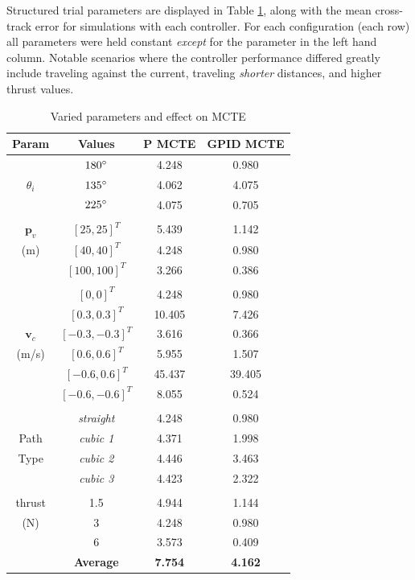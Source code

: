 \documentclass[conference]{IEEEtran}
\begin{document}
Structured trial parameters are displayed in Table \ref{table:str_trials}, along with the mean cross-track error for simulations with each controller. For each configuration (each row) all parameters were held constant \textit{except} for the parameter in the left hand column. Notable scenarios where the controller performance differed greatly include traveling against the current, traveling \textit{shorter} distances, and higher thrust values.

\begin{table}[h]\label{table:str_trials}
\normalsize
\centering
\begin{tabular}{c | c c c}
\rowcolor{gray!20}
Param & Values & P MCTE & GPID MCTE \\
\hline
& $180\degree$ & 4.248 & 0.980 \\
$\theta_i$ & $135\degree$ & 4.062 & 4.075 \\
& $225\degree$ & 4.075 & 0.705 \\
\hline \\
$\bm{p}_v$ & $[25, 25]^T$ & 5.439 & 1.142 \\
(m) & $[40, 40]^T$ & 4.248 & 0.980 \\
& $[100, 100]^T$ & 3.266 & 0.386 \\
\hline \\
& $[0, 0]^T$ & 4.248 & 0.980 \\
& $[0.3, 0.3]^T$ & 10.405 & 7.426 \\
$\bm{v}_c$ & $[-0.3, -0.3]^T$ & 3.616 & 0.366 \\
(m/s) & $[0.6, 0.6]^T$ & 5.955 & 1.507 \\
& $[-0.6, 0.6]^T$ & 45.437 & 39.405 \\
& $[-0.6, -0.6]^T$ & 8.055 & 0.524 \\
\hline \\
& \textit{straight} & 4.248 & 0.980 \\
Path & \textit{cubic 1} & 4.371 & 1.998 \\
Type & \textit{cubic 2} & 4.446 & 3.463 \\
& \textit{cubic 3} & 4.423 & 2.322 \\
\hline \\
thrust & 1.5 & 4.944 & 1.144 \\
(N) & 3 & 4.248 & 0.980 \\
& 6 & 3.573 & 0.409 \\
\hline
\hline
& \textbf{Average} & \textbf{7.754} & \textbf{4.162}
\end{tabular}
\caption{Varied parameters and effect on MCTE}\label{table:str_trials}
\end{table}
\end{document}
